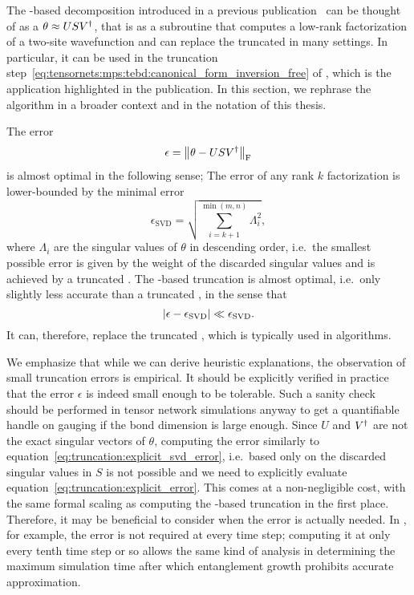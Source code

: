 The -based decomposition introduced in a previous publication~\cite{unfried2023} can be thought of as a  $\theta \approx U S V^\dagger$, that is as a subroutine that computes a low-rank factorization of a two-site wavefunction and can replace the truncated  in many settings.
%
In particular, it can be used in the truncation step~\eqref{eq:tensornets:mps:tebd:canonical_form_inversion_free} of , which is the application highlighted in the publication.
%
In this section, we rephrase the algorithm in a broader context and in the notation of this thesis.

The error
\begin{equation}
    \label{eq:truncation:explicit_error}
    \epsilon = \Fnorm{\theta - U S \hconj{V}}
\end{equation}
is almost optimal in the following sense;
%
The error of any rank $k$ factorization is lower-bounded by the minimal error
\begin{equation}
    \label{eq:truncation:explicit_svd_error}
    \epsilon_\text{SVD} = \sqrt{\sum_{i = k + 1}^{\min(m, n)} \Lambda_i^2},
\end{equation}
where $\Lambda_i$ are the singular values of $\theta$ in descending order, i.e.~the smallest possible error is given by the weight of the discarded singular values and is achieved by a truncated .
%
The -based truncation is almost optimal, i.e.~only slightly less accurate than a truncated , in the sense that
\begin{equation}
    \label{eq:truncation:small_error}
    \abs{\epsilon - \epsilon_\text{SVD}} \ll \epsilon_\text{SVD}.
\end{equation}
%
It can, therefore, replace the truncated , which is typically used in  algorithms.

We emphasize that while we can derive heuristic explanations, the observation of small truncation errors is empirical.
%
It should be explicitly verified in practice that the error $\epsilon$ is indeed small enough to be tolerable.
%
Such a sanity check should be performed in tensor network simulations anyway to get a quantifiable handle on gauging if the bond dimension is large enough.
%
Since $U$ and $V^\dagger$ are not the exact singular vectors of $\theta$, computing the error similarly to equation~\eqref{eq:truncation:explicit_svd_error}, i.e.~based only on the discarded singular values in $S$ is not possible and we need to explicitly evaluate equation~\eqref{eq:truncation:explicit_error}.
%
This comes at a non-negligible cost, with the same formal scaling as computing the -based truncation in the first place.
%
Therefore, it may be beneficial to consider when the error is actually needed.
%
In , for example, the error is not required at every time step; computing it at only every tenth time step or so allows the same kind of analysis in determining the maximum simulation time after which entanglement growth prohibits accurate  approximation.


